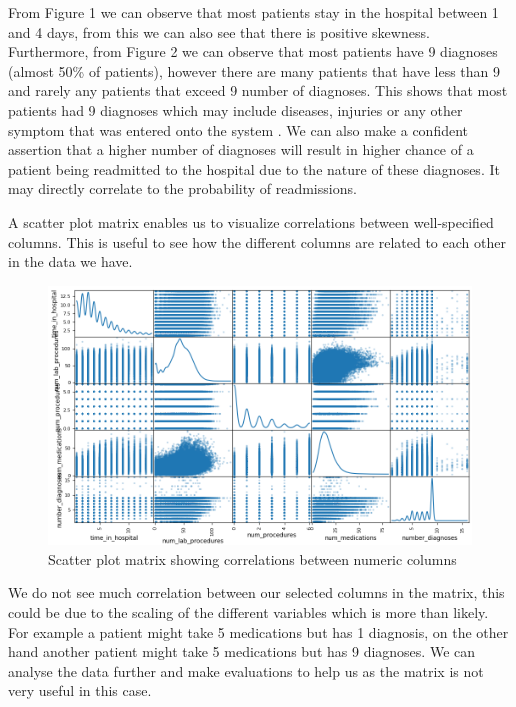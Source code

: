 \documentclass[11pt]{report}
\newcommand{\linespace}{\vspace{0.3cm}\noindent}
\begin{document}
\noindent
From Figure 1 we can observe that most patients stay in the hospital between 1 and 4 days, from this we can also see that there is positive skewness. Furthermore, from Figure 2 we can observe that most patients have 9 diagnoses (almost 50\% of patients), however there are many patients that have less than 9 and rarely any patients that exceed 9 number of diagnoses. This shows that most patients had 9 diagnoses which may include diseases, injuries or any other symptom that was entered onto the system \cite{table2}. We can also make a confident assertion that a higher number of diagnoses will result in higher chance of a patient being readmitted to the hospital due to the nature of these diagnoses. It may directly correlate to the probability of readmissions.

\linespace
A scatter plot matrix enables us to visualize correlations between well-specified columns. This is useful to see how the different columns are related to each other in the data we have. 


\begin{figure}[h!]
  \centering
\includegraphics[width=1\textwidth]{combined_matrix.png}
  \caption{Scatter plot matrix showing correlations between numeric columns}
\end{figure}

\linespace
We do not see much correlation between our selected columns in the matrix, this could be due to the scaling of the different variables which is more than likely. For example a patient might take 5 medications but has 1 diagnosis, on the other hand another patient might take 5 medications but has 9 diagnoses. We can analyse the data further and make evaluations to help us as the matrix is not very useful in this case. 
\end{document}
